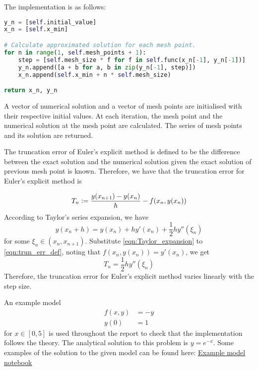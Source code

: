 The implementation is as follows:
\begin{lstlisting}[language=Python, caption= {Euler's explicit method}, title={Euler's explicit method}, label=Euler_explicit_code]
y_n = [self.initial_value]
x_n = [self.x_min]

# Calculate approximated solution for each mesh point.
for n in range(1, self.mesh_points + 1):
    step = [self.mesh_size * f for f in self.func(x_n[-1], y_n[-1])]
    y_n.append([a + b for a, b in zip(y_n[-1], step)])
    x_n.append(self.x_min + n * self.mesh_size)

return x_n, y_n
\end{lstlisting}

A vector of numerical solution and a vector of mesh points are initialised with their respective initial values. At each iteration, the mesh point and the numerical solution at the mesh point are calculated. The series of mesh points and its solution are returned.

The truncation error of Euler's explicit method is defined to be the difference between the exact solution and the numerical solution given the exact solution of previous mesh point is known. Therefore, we have that the truncation error for Euler's explicit method is

\begin{equation}
\label{eqn:trun_err_def}
    T_n \vcentcolon= \frac{y(x_{n+1}) - y(x_{n})}{h} - f(x_n, y(x_n))
\end{equation}
According to Taylor's series expansion, we have 
\begin{equation}
\label{eqn:Taylor_expansion}
    y(x_n + h) = y(x_n) + hy'(x_n) + \frac{1}{2}hy''(\xi_n)
\end{equation}
for some $\xi_n \in (x_n, x_{n+1})$. Substitute \ref{eqn:Taylor_expansion} to \ref{eqn:trun_err_def}, noting that $f(x_n, y(x_n)) = y'(x_n)$, we get
\begin{equation}
    T_n = \frac{1}{2}hy''(\xi_n)
\end{equation}
Therefore, the truncation error for Euler's explicit method varies linearly with the step size.

An example model 
\begin{align}
\label{eqn:example_model}
    f(x,y) &= -y \\
    y(0) &= 1
\end{align}
for $x \in [0, 5]$ is used throughout the report to check that the implementation follows the theory. The analytical solution to this problem is $y = e^{-x}$. Some examples of the solution to the given model can be found here: \href{https://nbviewer.jupyter.org/github/FarmHJ/numerical-solver/blob/main/examples/solver_convergence.ipynb}{Example model notebook}

